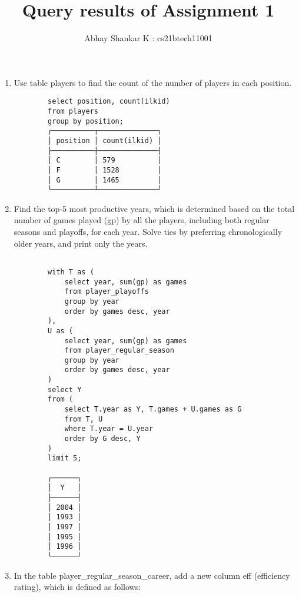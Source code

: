 \documentclass[12pt]{amsart}   	%
\begin{document}
    \title{Query results of Assignment 1}
    \author{Abhay Shankar K : cs21btech11001}
    \maketitle

    \begin{enumerate}
        \item Use table players to find the count of the number of players in each position. 

        \begin{verbatim}
        select position, count(ilkid) 
        from players 
        group by position;
        ┌──────────┬──────────────┐
        │ position │ count(ilkid) │
        ├──────────┼──────────────┤
        │ C        │ 579          │
        │ F        │ 1528         │
        │ G        │ 1465         │
        └──────────┴──────────────┘\end{verbatim}
        
        \item Find the top-5 most productive years, which is determined based on the total number 
        of games played (gp) by all the players, including both regular seasons and playoffs, for each year. 
        Solve ties by preferring chronologically older years, and print only the years.
        \begin{verbatim}
            
        with T as (
            select year, sum(gp) as games 
            from player_playoffs 
            group by year 
            order by games desc, year
        ),
        U as (
            select year, sum(gp) as games 
            from player_regular_season 
            group by year 
            order by games desc, year
        )
        select Y 
        from (
            select T.year as Y, T.games + U.games as G 
            from T, U 
            where T.year = U.year 
            order by G desc, Y
        )
        limit 5;
        
        ┌──────┐
        │  Y   │
        ├──────┤
        │ 2004 │
        │ 1993 │
        │ 1997 │
        │ 1995 │
        │ 1996 │
        └──────┘
        \end{verbatim}
        
        \item In the table player\_regular\_season\_career, add a new column eff (efficiency rating), which is defined as follows:
        

\end{enumerate}
\end{document}
